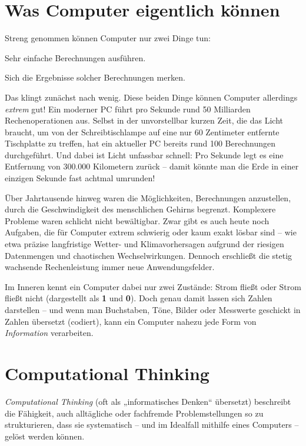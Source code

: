 \section{Was Computer eigentlich können}

Streng genommen können Computer nur zwei Dinge tun:

\begin{compactenum}[1.]
\item Sehr einfache Berechnungen ausführen.
\item Sich die Ergebnisse solcher Berechnungen merken.
\end{compactenum}

Das klingt zunächst nach wenig. Diese beiden Dinge können Computer allerdings
\emph{extrem} gut! Ein moderner PC führt pro Sekunde rund 50 Milliarden
Rechenoperationen aus. Selbst in der unvorstellbar kurzen Zeit, die das Licht
braucht, um von der Schreibtischlampe auf eine nur 60 Zentimeter entfernte
Tischplatte zu treffen, hat ein aktueller PC bereits rund 100 Berechnungen
durchgeführt. Und dabei ist Licht unfassbar schnell: Pro Sekunde legt es eine
Entfernung von 300.000 Kilometern zurück -- damit könnte man die Erde in einer
einzigen Sekunde fast achtmal umrunden!

Über Jahrtausende hinweg waren die Möglichkeiten, Berechnungen anzustellen,
durch die Geschwindigkeit des menschlichen Gehirns begrenzt. Komplexere Probleme
waren schlicht nicht bewältigbar. Zwar gibt es auch heute noch Aufgaben, die für
Computer extrem schwierig oder kaum exakt lösbar sind -- wie etwa präzise
langfristige Wetter- und Klimavorhersagen aufgrund der riesigen Datenmengen und
chaotischen Wechselwirkungen. Dennoch erschließt die stetig wachsende
Rechenleistung immer neue Anwendungsfelder.

Im Inneren kennt ein Computer dabei nur zwei Zustände: Strom fließt oder Strom
fließt nicht (dargestellt als \textbf{1} und \textbf{0}). Doch genau damit lassen
sich Zahlen darstellen -- und wenn man Buchstaben, Töne, Bilder oder Messwerte
geschickt in Zahlen übersetzt (codiert), kann ein Computer nahezu jede Form von
\emph{Information} verarbeiten.


\section{Computational Thinking}

\emph{Computational Thinking} (oft als „informatisches Denken“ übersetzt)
beschreibt die Fähigkeit, auch alltägliche oder fachfremde Problemstellungen so zu
strukturieren, dass sie systematisch -- und im Idealfall mithilfe eines Computers --
gelöst werden können.


